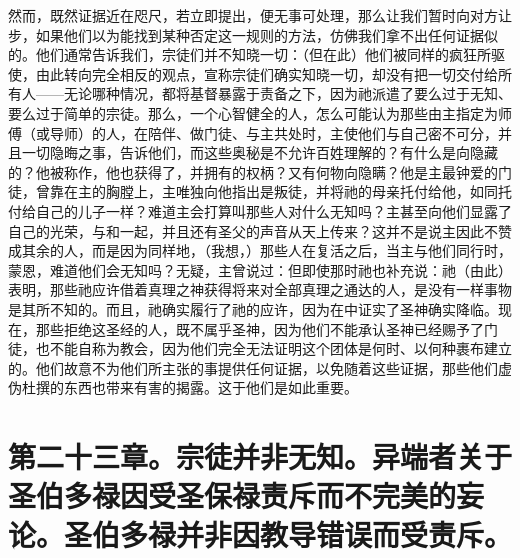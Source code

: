 然而，既然证据近在咫尺，若立即提出，便无事可处理，那么让我们暂时向对方让步，如果他们以为能找到某种否定这一规则的方法，仿佛我们拿不出任何证据似的。他们通常告诉我们，宗徒们并不知晓一切：（但在此）他们被同样的疯狂所驱使，由此转向完全相反的观点，宣称宗徒们确实知晓一切，却没有把一切交付给所有人——无论哪种情况，都将基督暴露于责备之下，因为祂派遣了要么过于无知、要么过于简单的宗徒。那么，一个心智健全的人，怎么可能认为那些由主指定为师傅（或导师）的人，在陪伴、做门徒、与主共处时，主使他们与自己密不可分，并且一切隐晦之事，告诉他们，而这些奥秘是不允许百姓理解的？有什么是向隐藏的？他被称作，他也获得了，并拥有的权柄？又有何物向隐瞒？他是主最钟爱的门徒，曾靠在主的胸膛上，主唯独向他指出是叛徒，并将祂的母亲托付给他，如同托付给自己的儿子一样？难道主会打算叫那些人对什么无知吗？主甚至向他们显露了自己的光荣，与和一起，并且还有圣父的声音从天上传来？这并不是说主因此不赞成其余的人，而是因为同样地，（我想，）那些人在复活之后，当主与他们同行时，蒙恩，难道他们会无知吗？无疑，主曾说过：但即使那时祂也补充说：祂（由此）表明，那些祂应许借着真理之神获得将来对全部真理之通达的人，是没有一样事物是其所不知的。而且，祂确实履行了祂的应许，因为在中证实了圣神确实降临。现在，那些拒绝这圣经的人，既不属乎圣神，因为他们不能承认圣神已经赐予了门徒，也不能自称为教会，因为他们完全无法证明这个团体是何时、以何种裹布建立的。他们故意不为他们所主张的事提供任何证据，以免随着这些证据，那些他们虚伪杜撰的东西也带来有害的揭露。这于他们是如此重要。\par


\section{第二十三章。宗徒并非无知。异端者关于圣伯多禄因受圣保禄责斥而不完美的妄论。圣伯多禄并非因教导错误而受责斥。}

